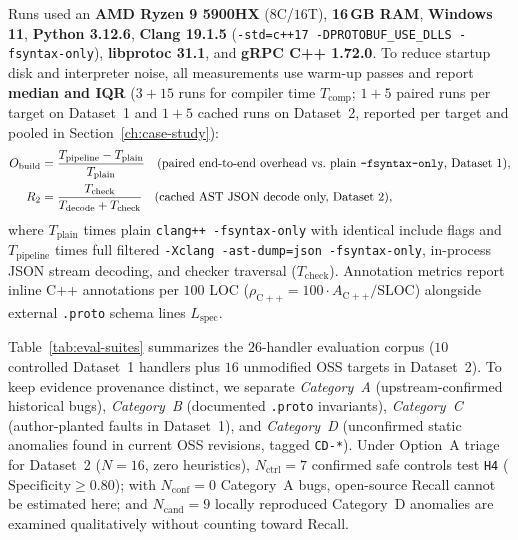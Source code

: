 Runs used an \textbf{AMD Ryzen 9 5900HX} ($8$C/$16$T), \textbf{16\,GB RAM}, \textbf{Windows 11}, \textbf{Python 3.12.6}, \textbf{Clang 19.1.5} (\texttt{-std=c++17 -DPROTOBUF\_USE\_DLLS -fsyntax-only}), \textbf{libprotoc 31.1}, and \textbf{gRPC C++ 1.72.0}. To reduce startup disk and interpreter noise, all measurements use warm-up passes and report \textbf{median and IQR} ($3+15$ runs for compiler time $T_{\mathrm{comp}}$; $1+5$ paired runs per target on Dataset~1 and $1+5$ cached runs on Dataset~2, reported per target and pooled in Section~\ref{ch:case-study}):
\begin{equation}
\label{eq:timing-ratios}
\begin{aligned}
O_{\mathrm{build}} &= \frac{T_{\mathrm{pipeline}} - T_{\mathrm{plain}}}{T_{\mathrm{plain}}} \quad (\text{paired end-to-end overhead vs.\ plain \texttt{-fsyntax-only}, Dataset~1}), \\
R_2 &= \frac{T_{\mathrm{check}}}{T_{\mathrm{decode}} + T_{\mathrm{check}}} \quad (\text{cached AST JSON decode only, Dataset~2}),
\end{aligned}
\end{equation}
where $T_{\mathrm{plain}}$ times plain \texttt{clang++ -fsyntax-only} with identical include flags and $T_{\mathrm{pipeline}}$ times full filtered \texttt{-Xclang -ast-dump=json -fsyntax-only}, in-process JSON stream decoding, and checker traversal ($T_{\mathrm{check}}$). Annotation metrics report inline C++ annotations per $100$ LOC ($\rho_{\mathrm{C++}} = 100 \cdot A_{\mathrm{C++}} / \mathrm{SLOC}$) alongside external \texttt{.proto} schema lines $L_{\mathrm{spec}}$.

Table~\ref{tab:eval-suites} summarizes the $26$-handler evaluation corpus ($10$ controlled Dataset~1 handlers plus $16$ unmodified OSS targets in Dataset~2). To keep evidence provenance distinct, we separate \emph{Category~A} (upstream-confirmed historical bugs), \emph{Category~B} (documented \texttt{.proto} invariants), \emph{Category~C} (author-planted faults in Dataset~1), and \emph{Category~D} (unconfirmed static anomalies found in current OSS revisions, tagged \texttt{CD-*}). Under Option~A triage for Dataset~2 ($N=16$, zero heuristics), $N_{\mathrm{ctrl}}=7$ confirmed safe controls test \texttt{H4} ($\mathrm{Specificity} \ge 0.80$); with $N_{\mathrm{conf}}=0$ Category~A bugs, open-source Recall cannot be estimated here; and $N_{\mathrm{cand}}=9$ locally reproduced Category~D anomalies are examined qualitatively without counting toward Recall.

